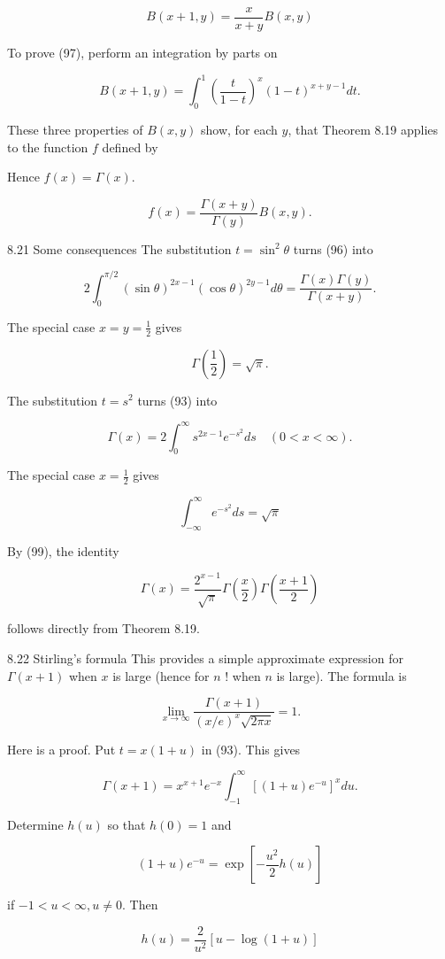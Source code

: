 \documentclass[10pt]{article}
\begin{document}
$$
B(x+1, y)=\frac{x}{x+y} B(x, y)
$$

To prove (97), perform an integration by parts on

$$
B(x+1, y)=\int_{0}^{1}\left(\frac{t}{1-t}\right)^{x}(1-t)^{x+y-1} d t .
$$

These three properties of $B(x, y)$ show, for each $y$, that Theorem 8.19 applies to the function $f$ defined by

Hence $f(x)=\Gamma(x)$.

$$
f(x)=\frac{\Gamma(x+y)}{\Gamma(y)} B(x, y) .
$$

8.21 Some consequences The substitution $t=\sin ^{2} \theta$ turns (96) into

$$
2 \int_{0}^{\pi / 2}(\sin \theta)^{2 x-1}(\cos \theta)^{2 y-1} d \theta=\frac{\Gamma(x) \Gamma(y)}{\Gamma(x+y)} .
$$

The special case $x=y=\frac{1}{2}$ gives

$$
\Gamma\left(\frac{1}{2}\right)=\sqrt{\pi} .
$$

The substitution $t=s^{2}$ turns (93) into

$$
\Gamma(x)=2 \int_{0}^{\infty} s^{2 x-1} e^{-s^{2}} d s \quad(0<x<\infty) .
$$

The special case $x=\frac{1}{2}$ gives

$$
\int_{-\infty}^{\infty} e^{-s^{2}} d s=\sqrt{\pi}
$$

By (99), the identity

$$
\Gamma(x)=\frac{2^{x-1}}{\sqrt{\pi}} \Gamma\left(\frac{x}{2}\right) \Gamma\left(\frac{x+1}{2}\right)
$$

follows directly from Theorem 8.19.

8.22 Stirling's formula This provides a simple approximate expression for $\Gamma(x+1)$ when $x$ is large (hence for $n$ ! when $n$ is large). The formula is

$$
\lim _{x \rightarrow \infty} \frac{\Gamma(x+1)}{(x / e)^{x} \sqrt{2 \pi x}}=1 .
$$

Here is a proof. Put $t=x(1+u)$ in (93). This gives

$$
\Gamma(x+1)=x^{x+1} e^{-x} \int_{-1}^{\infty}\left[(1+u) e^{-u}\right]^{x} d u .
$$

Determine $h(u)$ so that $h(0)=1$ and

$$
(1+u) e^{-u}=\exp \left[-\frac{u^{2}}{2} h(u)\right]
$$

if $-1<u<\infty, u \neq 0$. Then

$$
h(u)=\frac{2}{u^{2}}[u-\log (1+u)]
$$
\end{document}
